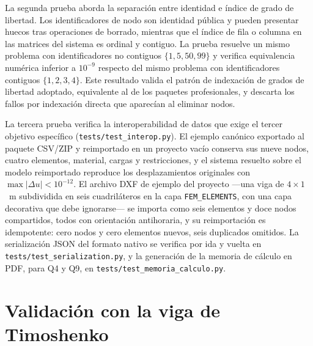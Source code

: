La segunda prueba aborda la separación entre identidad e índice de grado de libertad. Los identificadores de nodo son identidad pública y pueden presentar huecos tras operaciones de borrado, mientras que el índice de fila o columna en las matrices del sistema es ordinal y contiguo. La prueba resuelve un mismo problema con identificadores no contiguos $\{1,5,50,99\}$ y verifica equivalencia numérica inferior a $10^{-9}$ respecto del mismo problema con identificadores contiguos $\{1,2,3,4\}$. Este resultado valida el patrón de indexación de grados de libertad adoptado, equivalente al de los paquetes profesionales, y descarta los fallos por indexación directa que aparecían al eliminar nodos.

La tercera prueba verifica la interoperabilidad de datos que exige el tercer objetivo específico (\texttt{tests/test\_interop.py}). El ejemplo canónico exportado al paquete CSV/ZIP y reimportado en un proyecto vacío conserva sus nueve nodos, cuatro elementos, material, cargas y restricciones, y el sistema resuelto sobre el modelo reimportado reproduce los desplazamientos originales con $\max|\Delta u| < 10^{-12}$. El archivo DXF de ejemplo del proyecto —una viga de $4\times1$~m subdividida en seis cuadriláteros en la capa \texttt{FEM\_ELEMENTS}, con una capa decorativa que debe ignorarse— se importa como seis elementos y doce nodos compartidos, todos con orientación antihoraria, y su reimportación es idempotente: cero nodos y cero elementos nuevos, seis duplicados omitidos. La serialización JSON del formato nativo se verifica por ida y vuelta en \texttt{tests/test\_serialization.py}, y la generación de la memoria de cálculo en PDF, para Q4 y Q9, en \texttt{tests/test\_memoria\_calculo.py}.

\section{Validación con la viga de Timoshenko}
\label{sec:timoshenko}

